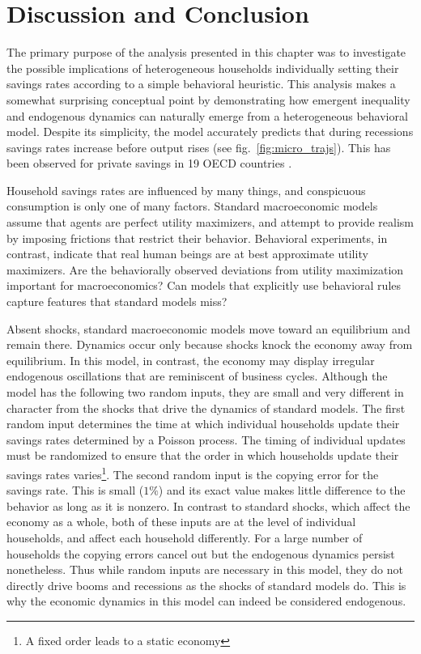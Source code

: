 \section{Discussion and Conclusion}

The primary purpose of the analysis presented in this chapter was to investigate the possible implications of heterogeneous households individually setting their savings rates according to a simple behavioral heuristic. This analysis makes a somewhat surprising conceptual point by demonstrating how emergent inequality and endogenous dynamics can naturally emerge from a heterogeneous behavioral model. Despite its simplicity, the model accurately predicts that during recessions savings rates increase before output rises (see fig.~\ref{fig:micro_trajs}).
This has been observed for private savings in 19 OECD countries \citep{adema2015business}. 

Household savings rates are influenced by many things, and conspicuous consumption is only one of many factors. Standard macroeconomic models assume that agents are perfect utility maximizers, and attempt to provide realism by imposing frictions that restrict their behavior. Behavioral experiments, in contrast, indicate that real human beings are at best approximate utility maximizers.  Are the behaviorally observed deviations from utility maximization important for macroeconomics?  Can models that explicitly use behavioral rules capture features that standard models miss?

Absent shocks, standard macroeconomic models move toward an equilibrium and remain there.   Dynamics occur only because shocks knock the economy away from equilibrium. In this model, in contrast, the economy may display irregular endogenous oscillations that are reminiscent of business cycles.  
Although the model has the following two random inputs, they are small and very different in character from the shocks that drive the dynamics of standard models. The first random input determines the time at which individual households update their savings rates determined by a Poisson process. The timing of individual updates must be randomized to ensure that the order in which households update their savings rates varies\footnote{A fixed order leads to a static economy}. The second random input is the copying error for the savings rate.  This is small ($1\%$) and its exact value makes little difference to the behavior as long as it is nonzero. In contrast to standard shocks, which affect the economy as a whole, both of these inputs are at the level of individual households, and affect each household differently. For a large number of households the copying errors cancel out but the endogenous dynamics persist nonetheless. Thus while random inputs are necessary in this model, they do not directly drive booms and recessions as the shocks of standard models do. This is why the economic dynamics in this model can indeed be considered endogenous.

